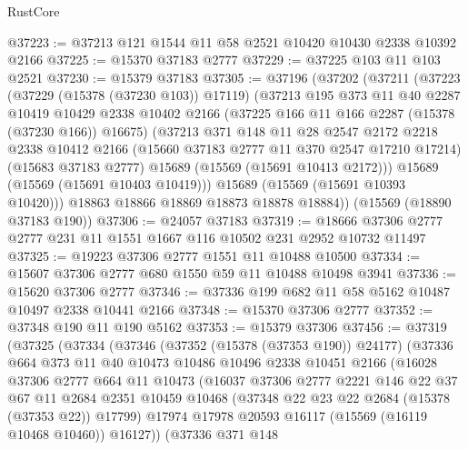 \begin{lexlean}{RustCore}
\begin{coremodule}
@37223 := @37213 @121 @1544 @11 @58 @2521 @10420 @10430 @2338 @10392 @2166
@37225 := @15370 @37183 @2777
@37229 := @37225 @103 @11 @103 @2521
@37230 := @15379 @37183
@37305 := @37196
    (@37202
      (@37211
        (@37223
          (@37229 (@15378 (@37230 @103)) @17119)
          (@37213
            @195
            @373
            @11
            @40
            @2287
            @10419
            @10429
            @2338
            @10402
            @2166
            (@37225 @166 @11 @166 @2287 (@15378 (@37230 @166)) @16675)
            (@37213
              @371
              @148
              @11
              @28
              @2547
              @2172
              @2218
              @2338
              @10412
              @2166
              (@15660 @37183 @2777 @11 @370 @2547 @17210 @17214)
              (@15683 @37183 @2777)
              @15689
              (@15569 (@15691 @10413 @2172)))
            @15689
            (@15569 (@15691 @10403 @10419)))
          @15689
          (@15569 (@15691 @10393 @10420)))
        @18863
        @18866
        @18869
        @18873
        @18878
        @18884))
    (@15569 (@18890 @37183 @190))
@37306 := @24057 @37183
@37319 := @18666 @37306 @2777 @2777 @231 @11 @1551 @1667 @116 @10502 @231 @2952 @10732 @11497
@37325 := @19223 @37306 @2777 @1551 @11 @10488 @10500
@37334 := @15607 @37306 @2777 @680 @1550 @59 @11 @10488 @10498 @3941
@37336 := @15620 @37306 @2777
@37346 := @37336 @199 @682 @11 @58 @5162 @10487 @10497 @2338 @10441 @2166
@37348 := @15370 @37306 @2777
@37352 := @37348 @190 @11 @190 @5162
@37353 := @15379 @37306
@37456 := @37319
    (@37325
      (@37334
        (@37346
          (@37352 (@15378 (@37353 @190)) @24177)
          (@37336
            @664
            @373
            @11
            @40
            @10473
            @10486
            @10496
            @2338
            @10451
            @2166
            (@16028
              @37306
              @2777
              @664
              @11
              @10473
              (@16037
                @37306
                @2777
                @2221
                @146
                @22
                @37
                @67
                @11
                @2684
                @2351
                @10459
                @10468
                (@37348 @22 @23 @22 @2684 (@15378 (@37353 @22)) @17799)
                @17974
                @17978
                @20593
                @16117
                (@15569 (@16119 @10468 @10460))
                @16127))
            (@37336
              @371
              @148

\end{coremodule}
\end{lexlean}
